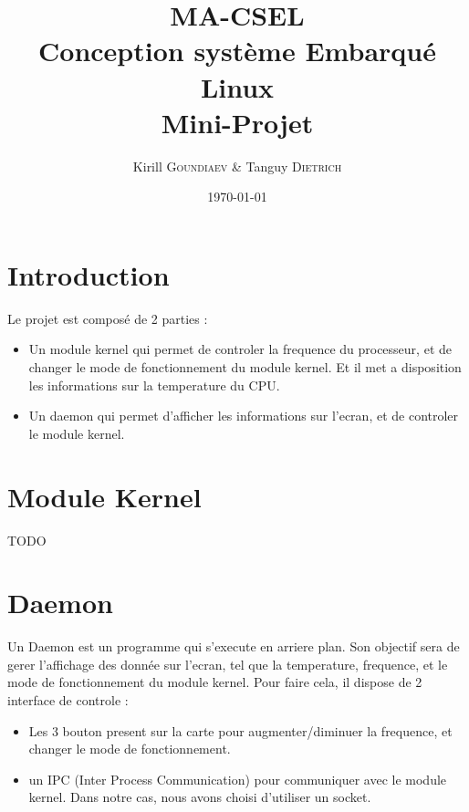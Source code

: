\documentclass[
	a4paper, %
	10pt, %
]{CSUniSchoolLabReport}
\title{MA-CSEL \\ Conception système Embarqué Linux \\ Mini-Projet } %
\author{Kirill \textsc{Goundiaev} \& Tanguy \textsc{Dietrich}} %
\date{\today} %
\begin{document}
\maketitle %

\begin{figure}[H] %
\label{fig:speciation}
\end{figure}


\newpage

\tableofcontents
\newpage

\section{Introduction}\label{Introduction}
Le projet est composé de 2 parties : \\
\begin{itemize}
	\item Un module kernel qui permet de controler la frequence du processeur, et de changer le mode de fonctionnement du module kernel. Et il met a disposition les informations sur la temperature du CPU.
	\item Un daemon qui permet d'afficher les informations sur l'ecran, et de controler le module kernel.
\end{itemize}


\section{Module Kernel}\label{ModuleKernel}
TODO


\section{Daemon}\label{Daemon}
Un Daemon est un programme qui s'execute en arriere plan. 
Son objectif sera de gerer l'affichage des donnée sur l'ecran, tel que la temperature, frequence, et le mode de fonctionnement du module kernel.
Pour faire cela, il dispose de 2 interface de controle : \\
\begin{itemize}
	\item Les 3 bouton present sur la carte pour augmenter/diminuer la frequence, et changer le mode de fonctionnement.
	\item un IPC (Inter Process Communication) pour communiquer avec le module kernel. Dans notre cas, nous avons choisi d'utiliser un socket.
\end{itemize}
\end{document}
